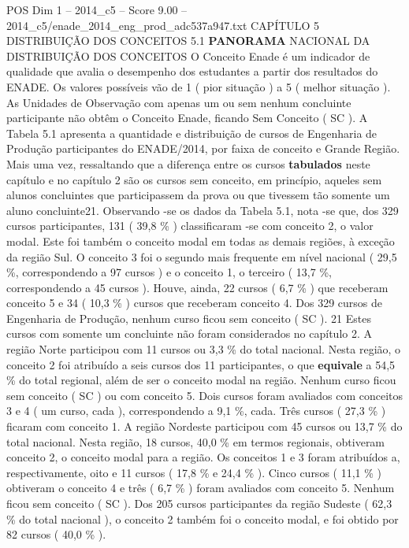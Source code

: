 \begin{textsample}{POS Dim 1 – 2014\_c5 – Score 9.00 – 2014\_c5/enade\_2014\_eng\_prod\_adc537a947.txt}  \label{ex:f1_pos_107}
CAPÍTULO 5 DISTRIBUIÇÃO DOS CONCEITOS 5.1 \textbf{PANORAMA} NACIONAL DA DISTRIBUIÇÃO DOS CONCEITOS O Conceito Enade é um indicador de qualidade que avalia o desempenho dos estudantes a partir dos resultados do ENADE.
Os valores possíveis vão de 1 ( pior situação ) a 5 ( melhor situação ).
As Unidades de Observação com apenas um ou sem nenhum concluinte participante não obtêm o Conceito Enade, ficando Sem Conceito ( SC ).
A Tabela 5.1 apresenta a quantidade e distribuição de cursos de Engenharia de Produção participantes do ENADE/2014, por faixa de conceito e Grande Região.
Mais uma vez, ressaltando que a diferença entre os cursos \textbf{tabulados} neste capítulo e no capítulo 2 são os cursos sem conceito, em princípio, aqueles sem alunos concluintes que participassem da prova ou que tivessem tão somente um aluno concluinte21.
Observando -se os dados da Tabela 5.1, nota -se que, dos 329 cursos participantes, 131 ( 39,8 \% ) classificaram -se com conceito 2, o valor modal.
Este foi também o conceito modal em todas as demais regiões, à exceção da região Sul.
O conceito 3 foi o segundo mais frequente em nível nacional ( 29,5 \%, correspondendo a 97 cursos ) e o conceito 1, o terceiro ( 13,7 \%, correspondendo a 45 cursos ).
Houve, ainda, 22 cursos ( 6,7 \% ) que receberam conceito 5 e 34 ( 10,3 \% ) cursos que receberam conceito 4.
Dos 329 cursos de Engenharia de Produção, nenhum curso ficou sem conceito ( SC ). 21 Estes cursos com somente um concluinte não foram considerados no capítulo 2.
A região Norte participou com 11 cursos ou 3,3 \% do total nacional.
Nesta região, o conceito 2 foi atribuído a seis cursos dos 11 participantes, o que \textbf{equivale} a 54,5 \% do total regional, além de ser o conceito modal na região.
Nenhum curso ficou sem conceito ( SC ) ou com conceito 5.
Dois cursos foram avaliados com conceitos 3 e 4 ( um curso, cada ), correspondendo a 9,1 \%, cada.
Três cursos ( 27,3 \% ) ficaram com conceito 1.
A região Nordeste participou com 45 cursos ou 13,7 \% do total nacional.
Nesta região, 18 cursos, 40,0 \% em termos regionais, obtiveram conceito 2, o conceito modal para a região.
Os conceitos 1 e 3 foram atribuídos a, respectivamente, oito e 11 cursos ( 17,8 \% e 24,4 \% ).
Cinco cursos ( 11,1 \% ) obtiveram o conceito 4 e três ( 6,7 \% ) foram avaliados com conceito 5.
Nenhum ficou sem conceito ( SC ).
Dos 205 cursos participantes da região Sudeste ( 62,3 \% do total nacional ), o conceito 2 também foi o conceito modal, e foi obtido por 82 cursos ( 40,0 \% ).

\end{textsample}
